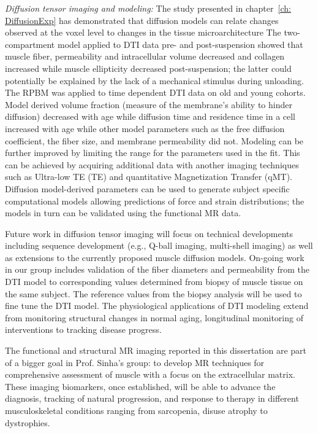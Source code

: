 \textit{Diffusion tensor imaging and modeling:} The study presented in chapter~\ref{ch: DiffusionExp} has demonstrated that diffusion models can relate changes observed at the voxel level to changes in the tissue microarchitecture
The two-compartment model applied to DTI data pre- and post-suspension showed that muscle fiber, permeability and intracellular volume decreased and collagen increased while muscle ellipticity decreased post-suspension; the latter could potentially be explained by the lack of a mechanical stimulus during unloading. 
The RPBM was applied to time dependent DTI data on old and young cohorts.
Model derived volume fraction (measure of the membrane's ability to hinder diffusion) decreased with age while diffusion time and residence time in a cell increased with age while other model parameters such as the free diffusion coefficient, the fiber size, and membrane permeability did not.
Modeling can be further improved by limiting the range for the parameters used in the fit.
This can be achieved by acquiring additional data with another imaging techniques such as Ultra-low TE (TE) and quantitative Magnetization Transfer (qMT).
Diffusion model-derived parameters can be used to generate subject specific computational models allowing predictions of force and strain distributions; the models in turn can be validated using the functional MR data.

Future work in diffusion tensor imaging will focus on technical developments including sequence development (e.g., Q-ball imaging, multi-shell imaging) as well as extensions to the currently proposed muscle diffusion models. 
On-going work in our group includes validation of the fiber diameters and permeability from the DTI model to corresponding values determined from biopsy of muscle tissue on the same subject. 
The reference values from the biopsy analysis will be used to fine tune the DTI model. 
The physiological applications of DTI modeling extend from monitoring structural changes in normal aging, longitudinal monitoring of interventions to tracking disease progress.

The functional and structural MR imaging reported in this dissertation are part of a bigger goal in Prof. Sinha's group: to develop MR techniques for comprehensive assessment of muscle with a focus on the extracellular matrix.
 These imaging biomarkers, once established, will be able to advance the diagnosis, tracking of natural progression, and response to therapy in different musculoskeletal conditions ranging from sarcopenia, disuse atrophy to dystrophies. 